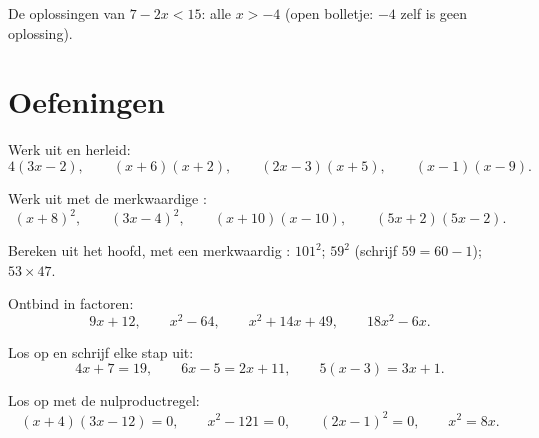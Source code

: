 \begin{omfigure}

{\small De oplossingen van $7 - 2x < 15$: alle $x > -4$ (open bolletje: $-4$ zelf
is geen oplossing).}
\end{omfigure}

\section{Oefeningen}

\begin{exercise}[$\star$]\label{exo:g9:algebra:1}
Werk uit en herleid:
\[
4(3x - 2), \qquad
(x + 6)(x + 2), \qquad
(2x - 3)(x + 5), \qquad
(x - 1)(x - 9).
\]
\end{exercise}

\begin{exercise}[$\star$]\label{exo:g9:algebra:2}
Werk uit met de merkwaardige :
\[
(x + 8)^2, \qquad
(3x - 4)^2, \qquad
(x + 10)(x - 10), \qquad
(5x + 2)(5x - 2).
\]
\end{exercise}

\begin{exercise}[$\star$]\label{exo:g9:algebra:3}
Bereken uit het hoofd, met een merkwaardig : $101^2$; \quad $59^2$ (schrijf
$59 = 60 - 1$); \quad $53 \times 47$.
\end{exercise}

\begin{exercise}[$\star$]\label{exo:g9:algebra:4}
Ontbind in factoren:
\[
9x + 12, \qquad
x^2 - 64, \qquad
x^2 + 14x + 49, \qquad
18x^2 - 6x .
\]
\end{exercise}

\begin{exercise}[$\star$]\label{exo:g9:algebra:5}
Los op en schrijf elke stap uit:
\[
4x + 7 = 19, \qquad
6x - 5 = 2x + 11, \qquad
5(x - 3) = 3x + 1 .
\]
\end{exercise}

\begin{exercise}[$\star\star$]\label{exo:g9:algebra:6}
Los op met de nulproductregel:
\[
(x + 4)(3x - 12) = 0, \qquad
x^2 - 121 = 0, \qquad
(2x - 1)^2 = 0, \qquad
x^2 = 8x .
\]
\end{exercise}

